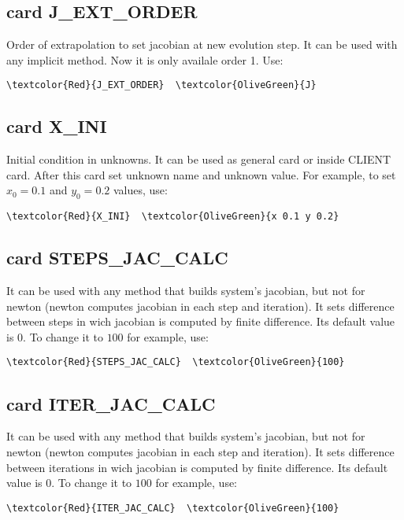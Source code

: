 \subsection{card J_EXT_ORDER}
Order of extrapolation to set jacobian at new evolution step. It can be used with any implicit method. Now it is only availale order 1. Use:
\begin{Verbatim}[frame=single,commandchars=\\\{\}]
\textcolor{Red}{J_EXT_ORDER}  \textcolor{OliveGreen}{J}
\end{Verbatim}


\subsection{card X_INI}
Initial condition in unknowns. It can be used as general card or inside CLIENT card. After this card set unknown name and unknown value. For example, to set $x_0=0.1$ and $y_0=0.2$ values, use:
\begin{Verbatim}[frame=single,commandchars=\\\{\}]
\textcolor{Red}{X_INI}  \textcolor{OliveGreen}{x 0.1 y 0.2}
\end{Verbatim}

\subsection{card STEPS_JAC_CALC}
It can be used with any method that builds system's jacobian, but not for newton (newton computes jacobian in each step and iteration). It sets difference between steps in wich jacobian is computed by finite difference. Its default value is $0$. To change it to $100$ for example, use:
\begin{Verbatim}[frame=single,commandchars=\\\{\}]
\textcolor{Red}{STEPS_JAC_CALC}  \textcolor{OliveGreen}{100}
\end{Verbatim}

\subsection{card ITER_JAC_CALC}
It can be used with any method that builds system's jacobian, but not for newton (newton computes jacobian in each step and iteration). It sets difference between iterations in wich jacobian is computed by finite difference. Its default value is $0$. To change it to $100$ for example, use:
\begin{Verbatim}[frame=single,commandchars=\\\{\}]
\textcolor{Red}{ITER_JAC_CALC}  \textcolor{OliveGreen}{100}
\end{Verbatim}

